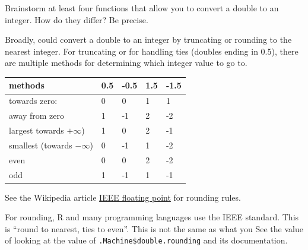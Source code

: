 \documentclass[]{book}
\newenvironment{Shaded}{\begin{snugshade}}{\end{snugshade}}
\newcommand{\CommentTok}[1]{\textcolor[rgb]{0.56,0.35,0.01}{\textit{#1}}}
\newcommand{\ControlFlowTok}[1]{\textcolor[rgb]{0.13,0.29,0.53}{\textbf{#1}}}
\newcommand{\DataTypeTok}[1]{\textcolor[rgb]{0.13,0.29,0.53}{#1}}
\newcommand{\DecValTok}[1]{\textcolor[rgb]{0.00,0.00,0.81}{#1}}
\newcommand{\FloatTok}[1]{\textcolor[rgb]{0.00,0.00,0.81}{#1}}
\newcommand{\KeywordTok}[1]{\textcolor[rgb]{0.13,0.29,0.53}{\textbf{#1}}}
\newcommand{\NormalTok}[1]{#1}
\newcommand{\OperatorTok}[1]{\textcolor[rgb]{0.81,0.36,0.00}{\textbf{#1}}}
\newcommand{\OtherTok}[1]{\textcolor[rgb]{0.56,0.35,0.01}{#1}}
\newcommand{\StringTok}[1]{\textcolor[rgb]{0.31,0.60,0.02}{#1}}
\theoremstyle{plain}
\theoremstyle{remark}
\begin{document}
Brainstorm at least four functions that allow you to convert a double to an integer. How do they differ? Be precise.

Broadly, could convert a double to an integer by truncating or rounding to the nearest integer.
For truncating or for handling ties (doubles ending in 0.5), there are multiple methods for determining which integer value to go to.

\begin{longtable}[]{@{}lllll@{}}
\toprule
methods & 0.5 & -0.5 & 1.5 & -1.5\tabularnewline
\midrule
\endhead
towards zero: & 0 & 0 & 1 & 1\tabularnewline
away from zero & 1 & -1 & 2 & -2\tabularnewline
largest towards \(+\infty\)) & 1 & 0 & 2 & -1\tabularnewline
smallest (towards \(-\infty\)) & 0 & -1 & 1 & -2\tabularnewline
even & 0 & 0 & 2 & -2\tabularnewline
odd & 1 & -1 & 1 & -1\tabularnewline
\bottomrule
\end{longtable}

See the Wikipedia article \href{https://en.wikipedia.org/wiki/IEEE_floating_point}{IEEE floating point} for rounding rules.

For rounding, R and many programming languages use the IEEE standard. This is ``round to nearest, ties to even''.
This is not the same as what you
See the value of looking at the value of \texttt{.Machine\$double.rounding} and its documentation.

\begin{Shaded}
\end{Shaded}
\end{document}
